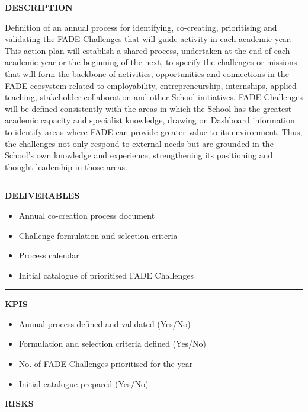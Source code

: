 \documentclass[11pt,a4paper]{scrreprt}
\newcommand{\fieldlabel}[1]{%
  {\footnotesize\sffamily\bfseries\color{mutedcolor}\MakeUppercase{#1}}\par\nopagebreak[4]
}
\newcommand{\fieldsep}{\vspace{3pt}\noindent\textcolor{bordercolor}{\rule{\linewidth}{0.4pt}}\vspace{3pt}\par}
\begin{document}
\vspace{8pt}

\begin{tcolorbox}[pabox={filcolor}{A.P.1.2 \enspace\textbullet\enspace Definition of the Annual Co-creation and Prioritisation Process for FADE Challenges}]

\fieldlabel{Description}
{\small Definition of an annual process for identifying, co-creating, prioritising and validating the FADE Challenges that will guide activity in each academic year. This action plan will establish a shared process, undertaken at the end of each academic year or the beginning of the next, to specify the challenges or missions that will form the backbone of activities, opportunities and connections in the FADE ecosystem related to employability, entrepreneurship, internships, applied teaching, stakeholder collaboration and other School initiatives. FADE Challenges will be defined consistently with the areas in which the School has the greatest academic capacity and specialist knowledge, drawing on Dashboard information to identify areas where FADE can provide greater value to its environment. Thus, the challenges not only respond to external needs but are grounded in the School's own knowledge and experience, strengthening its positioning and thought leadership in those areas. }\par
\fieldsep
\fieldlabel{Deliverables}
{\small \begin{itemize}[noitemsep,topsep=2pt]
\item Annual co-creation process document
\item Challenge formulation and selection criteria
\item Process calendar
\item Initial catalogue of prioritised FADE Challenges
\end{itemize}}\par
\fieldsep
\fieldlabel{KPIs}
{\small \begin{itemize}[noitemsep,topsep=2pt]
\item Annual process defined and validated (Yes/No)
\item Formulation and selection criteria defined (Yes/No)
\item No. of FADE Challenges prioritised for the year
\item Initial catalogue prepared (Yes/No)
\end{itemize}}\par
\end{tcolorbox}
\begin{tcolorbox}[riskbox]
{\footnotesize\sffamily\bfseries\color{red!50!black} RISKS}\par{}
\end{tcolorbox}
\end{document}
